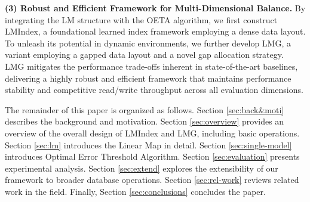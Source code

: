 
\textbf{(3) Robust and Efficient Framework for Multi-Dimensional Balance.} By integrating the LM structure with the OETA algorithm, we first construct LMIndex, a foundational learned index framework employing a dense data layout. To unleash its potential in dynamic environments, we further develop LMG, a variant employing a gapped data layout and a novel gap allocation strategy. LMG mitigates the performance trade-offs inherent in state-of-the-art baselines, delivering a highly robust and efficient framework that maintains performance stability and competitive read/write throughput across all evaluation dimensions.

The remainder of this paper is organized as follows. Section \ref{sec:back&moti} describes the background and motivation. Section \ref{sec:overview} provides an overview of the overall design of LMIndex and LMG, including basic operations. Section \ref{sec:lm} introduces the Linear Map in detail. Section \ref{sec:single-model} introduces Optimal Error Threshold Algorithm. Section \ref{sec:evaluation} presents experimental analysis. Section \ref{sec:extend} explores the extensibility of our framework to broader database operations. Section \ref{sec:rel-work} reviews related work in the field. Finally, Section \ref{sec:conclusions} concludes the paper.